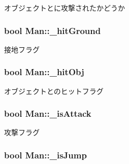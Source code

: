 オブジェクトとに攻撃されたかどうか 

\hypertarget{class_man_a1761302b9ee56b5ea67ff85a6b1c7804}{
\subsubsection[{\-\_\-hit\-Ground}]{\setlength{\rightskip}{0pt plus 5cm}bool Man\-::\-\_\-hit\-Ground\hspace{0.3cm}{\ttfamily [protected]}}}\label{class_man_a1761302b9ee56b5ea67ff85a6b1c7804}


接地フラグ 

\hypertarget{class_man_acaae84d59d74953ebb8cd7b09e5faaf0}{
\subsubsection[{\-\_\-hit\-Obj}]{\setlength{\rightskip}{0pt plus 5cm}bool Man\-::\-\_\-hit\-Obj\hspace{0.3cm}{\ttfamily [protected]}}}\label{class_man_acaae84d59d74953ebb8cd7b09e5faaf0}


オブジェクトとのヒットフラグ 

\hypertarget{class_man_a5b9699d0abb401113a8feef81b515647}{
\subsubsection[{\-\_\-is\-Attack}]{\setlength{\rightskip}{0pt plus 5cm}bool Man\-::\-\_\-is\-Attack\hspace{0.3cm}{\ttfamily [protected]}}}\label{class_man_a5b9699d0abb401113a8feef81b515647}


攻撃フラグ 

\hypertarget{class_man_adf303aeded2c5094c246d45edd2be7a6}{
\subsubsection[{\-\_\-is\-Jump}]{\setlength{\rightskip}{0pt plus 5cm}bool Man\-::\-\_\-is\-Jump\hspace{0.3cm}{\ttfamily [protected]}}}\label{class_man_adf303aeded2c5094c246d45edd2be7a6}



